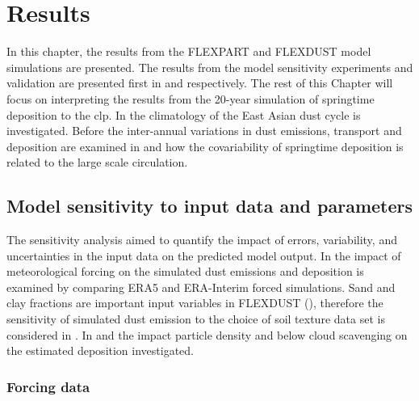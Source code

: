 \chapter{Results}\label{Chap:Results}
In this chapter, the results from the FLEXPART and FLEXDUST model simulations are presented. 
The results from the model sensitivity experiments and validation are presented first in  and  respectively. 
The rest of this Chapter will focus on interpreting the results from the 20-year simulation of springtime deposition to the \acrshort{clp}. 
In  the climatology of the East Asian dust cycle is investigated.   
Before the inter-annual variations in dust  emissions, transport and deposition are examined in  and how the covariability of springtime deposition is related to the large scale circulation. 


\section{Model sensitivity to input data and parameters}\label{sec:sensitvity_experiment}
The sensitivity analysis aimed to quantify the impact of errors, variability, and uncertainties in the input data on the predicted model output. 
In  the impact of meteorological forcing on the simulated dust emissions and deposition is examined by comparing ERA5 and ERA-Interim forced simulations. 
Sand and clay fractions are important input variables in FLEXDUST (), therefore the sensitivity of simulated dust emission to the choice of soil texture data set is considered in . 
In  and  the impact particle density and below cloud scavenging on the estimated deposition investigated. 
\subsection{Forcing data}\label{sec:sens_forcing}


